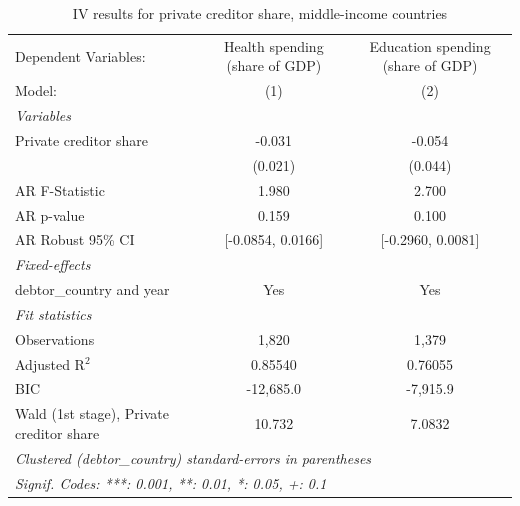 
\begin{table}[htbp]
   \caption{\label{tab:results_baseline_iv_overall_prvt_cred_other} IV results for private creditor share, middle-income countries}
   \centering
   \begin{tabular}{lcc}
      \tabularnewline \midrule \midrule
      Dependent Variables:                     & Health spending (share of GDP) & Education spending (share of GDP)\\  
      Model:                                   & (1)                            & (2)\\  
      \midrule
      \emph{Variables}\\
      Private creditor share                   & -0.031                         & -0.054\\   
                                               & (0.021)                        & (0.044)\\   
      AR F-Statistic                           & 1.980                          & 2.700\\  
      AR p-value                               & 0.159                          & 0.100\\  
      AR Robust 95\% CI                        & [-0.0854, 0.0166]              & [-0.2960, 0.0081]\\  
      \midrule
      \emph{Fixed-effects}\\
      debtor\_country and year                 & Yes                            & Yes\\  
      \midrule
      \emph{Fit statistics}\\
      Observations                             & 1,820                          & 1,379\\  
      Adjusted R$^2$                           & 0.85540                        & 0.76055\\  
      BIC                                      & -12,685.0                      & -7,915.9\\  
      Wald (1st stage), Private creditor share & 10.732                         & 7.0832\\  
      \midrule \midrule
      \multicolumn{3}{l}{\emph{Clustered (debtor\_country) standard-errors in parentheses}}\\
      \multicolumn{3}{l}{\emph{Signif. Codes: ***: 0.001, **: 0.01, *: 0.05, +: 0.1}}\\
   \end{tabular}
\end{table}


